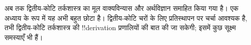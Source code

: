 \documentclass[../../../include/open-logic-chapter]{subfiles}
\begin{document}

\begin{editorial}
अब तक द्वितीय-कोटि तर्कशास्त्र का मूल वाक्यविन्यास और अर्थविज्ञान समाहित
किया गया है। एक अध्याय के रूप में यह अभी बहुत छोटा है। द्वितीय-कोटि चरों के
लिए प्रतिस्थापन पर चर्चा आवश्यक है, तभी द्वितीय-कोटि तर्कशास्त्र की
!!{derivation} प्रणालियों की बात की जा सकेगी; इसमें कुछ सूक्ष्म समस्याएँ भी हैं।
\end{editorial}







\OLEndChapterHook
\end{document}
